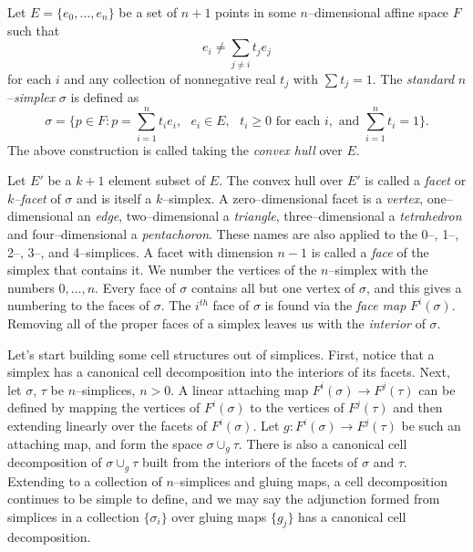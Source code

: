 \begin{defn}
	Let $E=\{e_0,\dots,e_n\}$ be a set of $n+1$ points in some $n$--dimensional affine space $F$ such that
	\[
	  e_i\neq \sum_{j\neq i}t_j e_j
	\]
	for each $i$ and any collection of nonnegative real $t_j$ with $\sum t_j=1$.
	The \emph{standard} $n$--\emph{simplex} $\sigma$ is defined as
	\[
	  \sigma = \{p\in F : p = \sum_{i=1}^n t_i e_i,\text{ } e_i\in E,\text{ } t_i\geq 0\text{ for each }i, \text{ and }\sum_{i=1}^n t_i=1\}.
	\]
	The above construction is called taking the \emph{convex hull} over $E$.
	
	Let $E'$ be a $k+1$ element subset of $E$.
	The convex hull over $E'$ is called a \emph{facet} or \emph{$k$--facet} of $\sigma$ and is itself a $k$--simplex.
	A zero--dimensional facet is a \emph{vertex}, one--dimensional an \emph{edge}, two--dimensional a \emph{triangle}, three--dimensional a \emph{tetrahedron} and four--dimensional a \emph{pentachoron}.
	These names are also applied to the 0--, 1--, 2--, 3--, and 4--simplices.
	A facet with dimension $n-1$ is called a \emph{face} of the simplex that contains it.
	We number the vertices of the $n$--simplex with the numbers $0,\dots,n$.
	Every face of $\sigma$ contains all but one vertex of $\sigma$, and this gives a numbering to the faces of $\sigma$.
	The $i^{th}$ face of $\sigma$ is found via the \emph{face map} $F^i(\sigma)$.
	Removing all of the proper faces of a simplex leaves us with the \emph{interior} of $\sigma$.
\end{defn}

Let's start building some cell structures out of simplices.
First, notice that a simplex has a canonical cell decomposition into the interiors of its facets.
Next, let $\sigma$, $\tau$ be $n$--simplices, $n>0$.
A linear attaching map $F^i(\sigma)\to F^j(\tau)$ can be defined by mapping the vertices of $F^i(\sigma)$ to the vertices of $F^j(\tau)$ and then extending linearly over the facets of $F^i(\sigma)$.
Let $g:F^i(\sigma)\to F^j(\tau)$ be such an attaching map, and form the space $\sigma\cup_g \tau$.
There is also a canonical cell decomposition of $\sigma\cup_g \tau$ built from the interiors of the facets of $\sigma$ and $\tau$.
Extending to a collection of $n$--simplices and gluing maps, a cell decomposition continues to be simple to define, and we may say the adjunction formed from simplices in a collection $\{\sigma_i\}$ over gluing maps $\{g_j\}$ has a canonical cell decomposition.

